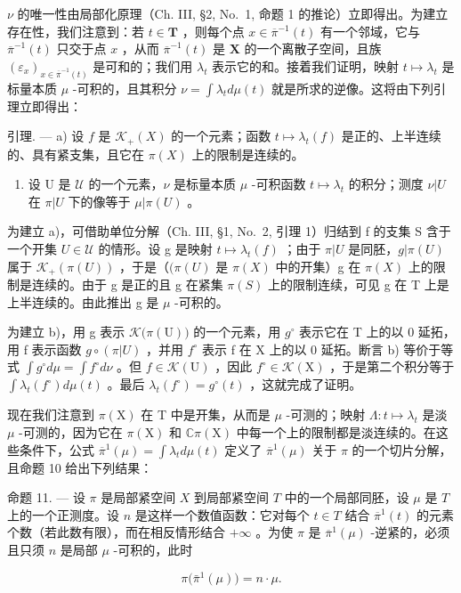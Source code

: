 \(\nu\) 的唯一性由局部化原理（Ch. III, §2, No.~1, 命题 1 的推论）立即得出。为建立存在性，我们注意到：若 \(t \in \mathbf{T}\) ，则每个点 \(x \in \overline{\pi}^{-1}(t)\) 有一个邻域，它与 \(\overline{\pi}^{-1}(t)\) 只交于点 \(x\) ，从而 \(\overline{\pi}^{-1}(t)\) 是 \(\mathbf{X}\) 的一个离散子空间，且族 \((\varepsilon_x)_{x \in \overline{\pi}^{-1}(t)}\) 是可和的；我们用 \(\lambda_t\) 表示它的和。接着我们证明，映射 \(t \mapsto \lambda_t\) 是标量本质 \(\mu\) -可积的，且其积分 \(\nu = \int \lambda_t d\mu(t)\) 就是所求的逆像。这将由下列引理立即得出：

引理. --- a) 设 \(f\) 是 \(\mathcal{K}_{+}(X)\) 的一个元素；函数 \(t \mapsto \lambda_{t}(f)\) 是正的、上半连续的、具有紧支集，且它在 \(\pi(X)\) 上的限制是连续的。

\begin{enumerate}
\def\labelenumi{\alph{enumi})}
\setcounter{enumi}{1}
\tightlist
\item
  设 U 是 \(\mathcal{U}\) 的一个元素，\(\nu\) 是标量本质 \(\mu\) -可积函数 \(t \mapsto \lambda_{t}\) 的积分；测度 \(\nu|U\) 在 \(\pi|U\) 下的像等于 \(\mu|\pi(U)\) 。
\end{enumerate}

为建立 a)，可借助单位分解（Ch. III, §1, No.~2, 引理 1）归结到 f 的支集 S 含于一个开集 \(U \in \mathcal{U}\) 的情形。设 g 是映射 \(t \mapsto \lambda_{t}(f)\) ；由于 \(\pi|U\) 是同胚，\(g|\pi(U)\) 属于 \(\mathcal{K}_{+}(\pi(U))\) ，于是（\((\pi(U)\) 是 \(\pi(X)\) 中的开集）g 在 \(\pi(X)\) 上的限制是连续的。由于 g 是正的且 g 在紧集 \(\pi(S)\) 上的限制连续，可见 g 在 T 上是上半连续的。由此推出 g 是 \(\mu\) -可积的。

为建立 b)，用 g 表示 \(\mathcal{K}\big(\pi(\mathrm{U})\big)\) 的一个元素，用 \(g^{\circ}\) 表示它在 T 上的以 0 延拓，用 f 表示函数 \(g \circ (\pi|U)\) ，并用 \(f^{\circ}\) 表示 f 在 X 上的以 0 延拓。断言 b) 等价于等式 \(\int g^{\circ} d\mu = \int f^{\circ} d\nu\) 。但 \(f \in \mathcal{K}(\mathrm{U})\) ，因此 \(f^{\circ} \in \mathcal{K}(\mathrm{X})\) ，于是第二个积分等于 \(\int \lambda_{t}(f^{\circ}) d\mu(t)\) 。最后 \(\lambda_{t}(f^{\circ}) = g^{\circ}(t)\) ，这就完成了证明。

现在我们注意到 \(\pi(\mathrm{X})\) 在 T 中是开集，从而是 \(\mu\) -可测的；映射 \(\Lambda: t \mapsto \lambda_t\) 是淡 \(\mu\) -可测的，因为它在 \(\pi(\mathrm{X})\) 和 \(\mathbb{C}\pi(\mathrm{X})\) 中每一个上的限制都是淡连续的。在这些条件下，公式 \(\overline{\pi}^{1}(\mu) = \int \lambda_t d\mu(t)\) 定义了 \(\overline{\pi}^{1}(\mu)\) 关于 \(\pi\) 的一个切片分解，且命题 10 给出下列结果：

命题 11. --- 设 \(\pi\) 是局部紧空间 \(X\) 到局部紧空间 \(T\) 中的一个局部同胚，设 \(\mu\) 是 \(T\) 上的一个正测度。设 \(n\) 是这样一个数值函数：它对每个 \(t \in T\) 结合 \(\overline{\pi}^{1}(t)\) 的元素个数（若此数有限），而在相反情形结合 \(+\infty\) 。为使 \(\pi\) 是 \(\overline{\pi}^{1}(\mu)\) -逆紧的，必须且只须 \(n\) 是局部 \(\mu\) -可积的，此时

\[
\pi \big (\bar {\pi} ^ {1} (\mu) \big) = n \cdot \mu .\tag{15}
\]

